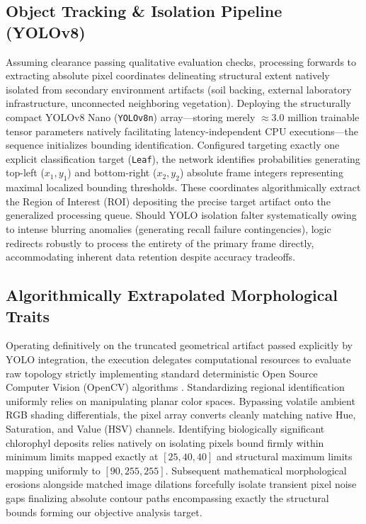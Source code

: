\documentclass[conference]{IEEEtran}
\begin{document}
\subsection{Object Tracking \& Isolation Pipeline (YOLOv8)}
Assuming clearance passing qualitative evaluation checks, processing forwards to extracting absolute pixel coordinates delineating structural extent natively isolated from secondary environment artifacts (soil backing, external laboratory infrastructure, unconnected neighboring vegetation). Deploying the structurally compact YOLOv8 Nano (\texttt{YOLOv8n}) array—storing merely $\approx 3.0$ million trainable tensor parameters natively facilitating latency-independent CPU executions—the sequence initializes bounding identification. Configured targeting exactly one explicit classification target (\texttt{Leaf}), the network identifies probabilities generating top-left ($x_1, y_1$) and bottom-right ($x_2, y_2$) absolute frame integers representing maximal localized bounding thresholds. These coordinates algorithmically extract the Region of Interest (ROI) depositing the precise target artifact onto the generalized processing queue. Should YOLO isolation falter systematically owing to intense blurring anomalies (generating recall failure contingencies), logic redirects robustly to process the entirety of the primary frame directly, accommodating inherent data retention despite accuracy tradeoffs.

\subsection{Algorithmically Extrapolated Morphological Traits}
Operating definitively on the truncated geometrical artifact passed explicitly by YOLO integration, the execution delegates computational resources to evaluate raw topology strictly implementing standard deterministic Open Source Computer Vision (OpenCV) algorithms \cite{opencv}. Standardizing regional identification uniformly relies on manipulating planar color spaces. Bypassing volatile ambient RGB shading differentials, the pixel array converts cleanly matching native Hue, Saturation, and Value (HSV) channels. Identifying biologically significant chlorophyl deposits relies natively on isolating pixels bound firmly within minimum limits mapped exactly at $[25, 40, 40]$ and structural maximum limits mapping uniformly to $[90, 255, 255]$. Subsequent mathematical morphological erosions alongside matched image dilations forcefully isolate transient pixel noise gaps finalizing absolute contour paths encompassing exactly the structural bounds forming our objective analysis target.
\end{document}
